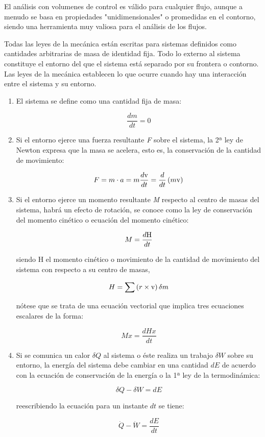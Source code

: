 El análisis con volumenes de control es válido para cualquier flujo,
aunque a menudo se basa en propiedades "unidimensionales" o promedidas
en el contorno, siendo una herramienta muy valiosa para el análisis de
los flujos.

Todas las leyes de la mecánica están escritas para sistemas definidos
como cantidades arbitrarias de masa de identidad fija. Todo lo externo
al sistema constituye el entorno del que el sistema está separado por su
frontera o contorno. Las leyes de la mecánica establecen lo que ocurre
cuando hay una interacción entre el sistema y su entorno.

\begin{enumerate}
\def\labelenumi{\arabic{enumi}.}
\item
  El sistema se define como una cantidad fija de masa:

  \[\frac {dm}{dt}=0\]
\item
  Si el entorno ejerce una fuerza resultante \emph{F} sobre el sistema,
  la 2ª ley de Newton expresa que la masa se acelera, esto es, la
  conservación de la cantidad de movimiento:

  \[F=m \cdot a= m \frac {d\text v}{dt}= \frac {d}{dt} \left( m \text v\right)\]
\item
  Si el entorno ejerce un momento resultante \emph{M} respecto al centro
  de masas del sistema, habrá un efecto de rotación, se conoce como la
  ley de conservación del momento cinético o ecuación del momento
  cinético:

  \[M= \frac {d \text H}{dt}\]

  siendo H el momento cinético o movimiento de la cantidad de movimiento
  del sistema con respecto a su centro de masas,

  \[H= \sum \left(r\times \text v \right) \delta m\]

  nótese que se trata de una ecuación vectorial que implica tres
  ecuaciones escalares de la forma:

  \[Mx=\frac{dHx}{dt}\]
\item
  Si se comunica un calor \(\delta Q\) al sistema o éste realiza un
  trabajo \(\delta W\) sobre su entorno, la energía del sistema debe
  cambiar en una cantidad \(dE\) de acuerdo con la ecuación de
  conservación de la energía o la 1ª ley de la termodinámica:

  \[\delta Q- \delta W = d E\]

  reescribiendo la ecuación para un instante \(dt\) se tiene:

  \[\dot{Q}-\dot{W}=\frac {dE}{dt}\]
\end{enumerate}

